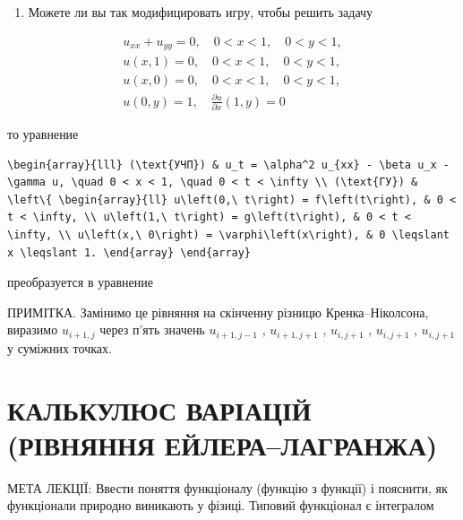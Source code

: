 \documentclass[
  ukrainian,
]{article}
\providecommand{\tightlist}{%
  \setlength{\itemsep}{0pt}\setlength{\parskip}{0pt}}
\begin{document}
\begin{enumerate}
\def\labelenumi{\arabic{enumi}.}
\setcounter{enumi}{3}
\tightlist
\item
  Можете ли вы так модифицировать игру, чтобы решить задачу
\end{enumerate}

\[
\begin{array}{l} u_{xx} + u_{yy} = 0, \quad 0 < x < 1, \quad 0 < y < 1, \\ u(x, 1) = 0, \quad 0 < x < 1, \quad 0 < y < 1, \\ u(x, 0) = 0, \quad 0 < x < 1, \quad 0 < y < 1, \\ u(0, y) = 1, \quad \frac{\partial u}{\partial x}(1, y) = 0 \end{array}
\]

то уравнение

\begin{verbatim}
\begin{array}{lll} (\text{УЧП}) & u_t = \alpha^2 u_{xx} - \beta u_x - \gamma u, \quad 0 < x < 1, \quad 0 < t < \infty \\ (\text{ГУ}) & \left\{ \begin{array}{ll} u\left(0,\ t\right) = f\left(t\right), & 0 < t < \infty, \\ u\left(1,\ t\right) = g\left(t\right), & 0 < t < \infty, \\ u\left(x,\ 0\right) = \varphi\left(x\right), & 0 \leqslant x \leqslant 1. \end{array} \end{array}
\end{verbatim}

преобразуется в уравнение

ПРИМІТКА. Замінимо це рівняння на скінченну різницю Кренка--Ніколсона,
виразимо \(u_{i+1,j}\) через п'ять значень \(u_{i+1,j-1}\) ,
\(u_{i+1,j+1}\) , \(u_{i,j+1}\) , \(u_{i,j+1}\) , \(u_{i,j+1}\) у
суміжних точках.

\section{КАЛЬКУЛЮС ВАРІАЦІЙ (РІВНЯННЯ
ЕЙЛЕРА--ЛАГРАНЖА)}\label{ux43aux430ux43bux44cux43aux443ux43bux44eux441-ux432ux430ux440ux456ux430ux446ux456ux439-ux440ux456ux432ux43dux44fux43dux43dux44f-ux435ux439ux43bux435ux440ux430ux43bux430ux433ux440ux430ux43dux436ux430}

МЕТА ЛЕКЦІЇ: Ввести поняття функціоналу (функцію з функції) і пояснити,
як функціонали природно виникають у фізиці. Типовий функціонал є
інтегралом
\end{document}
